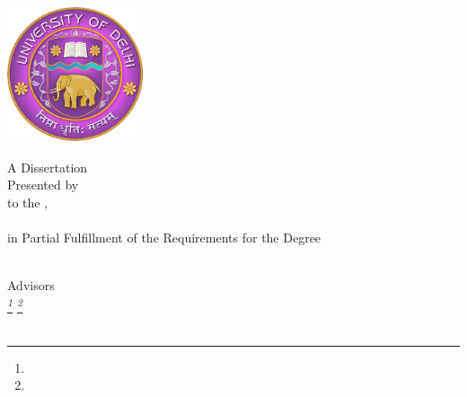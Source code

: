 \begin{titlepage}

\centering

\includegraphics[width=4cm, height=4cm]{res/du_logo.png}

\vspace{25mm}
{\huge\textcolor{mygray}\getTitle{}}

\vspace{25mm}
A Dissertation \\
Presented by {\itshape\getAuthor{}} \\
to the {\itshape\getDepartment{}}, \\
{\itshape\getUniversity{}} \\
in Partial Fulfillment of the Requirements for the Degree \\
{\itshape\getDegree{}} \\

\vspace{25mm}

Advisors\\ 
\vspace{5mm} 
{\itshape\getAdvisorFirst{}\footnote[1]{\getAdvisorOneDesc{}} \qquad \getAdvisorSecond{}\footnote[2]{\getAdvisorTwoDesc{}}}\\
\vspace{15mm}
\getSubmissionDate{} \\

\end{titlepage}
